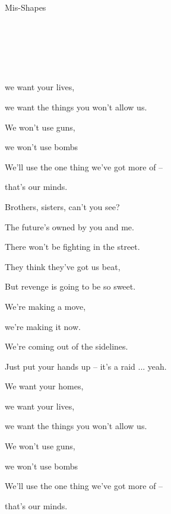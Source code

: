 \begin{song}{Mis-Shapes}{


	\mbox{ \AMaj \EMaj \Fshm \DMaj \DSeven}


	\mbox{ \GMaj \GMajSeven \GSeven \CMaj \CMajSeven \CSeven }
	

	\mbox{ \Em \EmSix \EmaddC }

}
\begin{SongVerse}
		we want your lives,

		we want the things you won't allow us. 

		We won't use guns, 

		we won't use bombs

		We'll use the one thing we've got more of --

		that's our minds.  \hspace{20pt}  \qquad {}

	\end{SongVerse}

	\begin{SongVerse}
				Brothers, sisters, can't you see? 

		The future's owned by you and me. 

		There won't be fighting in the street. 

		They think they've got us beat, 

		But revenge is going to be so sweet. 
	\end{SongVerse}

	\begin{SongVerse}		

		
		 \quad We're making a move, 

		we're making it now. 

		We're coming out of the sidelines. 

		\quad Just put your hands up -- it's a raid ... yeah.

		We want your homes,

		we want your lives,

		we want the things you won't allow us. 

		We won't use guns, 

		we won't use bombs

		We'll use the one thing we've got more of --

		that's our minds.  \hspace{20pt}  \qquad \ch{Em}

	 \end{SongVerse}

\end{song}